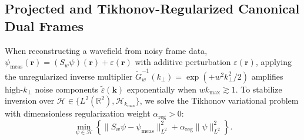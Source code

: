 \documentclass[aps,pra,reprint,nofootinbib,floatfix,longbibliography]{revtex4-2}
\theoremstyle{remark}
\newcommand{\norm}[1]{\lVert #1 \rVert}
\begin{document}
\subsection{Projected and Tikhonov-Regularized Canonical Dual Frames}
\label{subsec:tikhonov_dual}

When reconstructing a wavefield from noisy frame data, $\psi_{\mathrm{meas}}(\mathbf{r}) = (S_w\psi)(\mathbf{r}) + \varepsilon(\mathbf{r})$ with additive perturbation $\varepsilon(\mathbf{r})$, applying the unregularized inverse multiplier $\widetilde{G}_w^{-1}(k_\perp) = \exp(+w^2 k_\perp^2/2)$ amplifies high-$k_\perp$ noise components $\widetilde{\varepsilon}(\mathbf{k})$ exponentially when $w k_{\max} \gtrsim 1$. To stabilize inversion over $\mathcal{H} \in \{L^2(\mathbb{R}^2), \mathcal{H}_{k_{\max}}\}$, we solve the Tikhonov variational problem with dimensionless regularization weight $\alpha_{\mathrm{reg}} > 0$:
\begin{equation}
\min_{\psi \in \mathcal{H}} \left\{ \norm{S_w\psi - \psi_{\mathrm{meas}}}_{L^2}^2 + \alpha_{\mathrm{reg}}\norm{\psi}_{L^2}^2 \right\}.
\label{eq:tikhonov_opt}
\end{equation}
\end{document}
